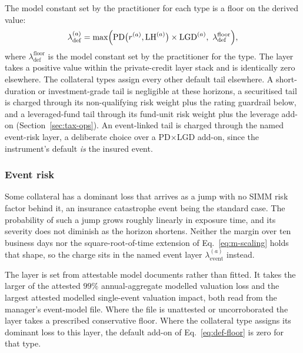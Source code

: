 The model constant set by the practitioner for each type is a floor on the derived value:
\begin{equation}\label{eq:def-floor}
\lambda^{(a)}_{\mathrm{def}} = \max\Bigl(\mathrm{PD}\bigl(r^{(a)},\mathrm{LH}^{(a)}\bigr)\times\mathrm{LGD}^{(a)},\ \lambda^{\mathrm{floor}}_{\mathrm{def}}\Bigr),
\end{equation}
where $\lambda^{\mathrm{floor}}_{\mathrm{def}}$ is the model constant set by the practitioner for the type. The layer takes a positive value within the private-credit layer stack and is identically zero elsewhere. The collateral types assign every other default tail elsewhere. A short-duration or investment-grade tail is negligible at these horizons, a securitised tail is charged through its non-qualifying risk weight plus the rating guardrail below, and a leveraged-fund tail through its fund-unit risk weight plus the leverage add-on (Section~\ref{sec:tax-ops}). An event-linked tail is charged through the named event-risk layer, a deliberate choice over a PD$\times$LGD add-on, since the instrument's default \emph{is} the insured event.

\subsubsection{Event risk}
Some collateral has a dominant loss that arrives as a jump with no SIMM risk factor behind it,
an insurance catastrophe event being the standard case. The probability of such a jump grows
roughly linearly in exposure time, and its severity does not diminish as the horizon shortens.
Neither the margin over ten business days nor the square-root-of-time extension of
Eq.~\eqref{eq:m-scaling} holds that shape, so the charge sits in the named event layer
$\lambda_{\mathrm{event}}^{(a)}$ instead.

The layer is set from attestable model documents rather than fitted. It takes the larger of
the attested $99\%$ annual-aggregate modelled valuation loss and the largest attested modelled
single-event valuation impact, both read from the manager's event-model file. Where the file
is unattested or uncorroborated the layer takes a prescribed conservative floor. Where the
collateral type assigns its dominant loss to this layer, the default add-on of
Eq.~\eqref{eq:def-floor} is zero for that type.

